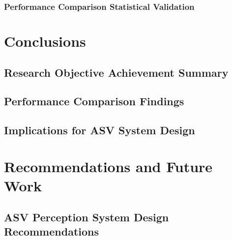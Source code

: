 \documentclass{erauthesis}
\begin{document}
\subsection{Performance Comparison Statistical Validation}

\chapter{Conclusions}


\section{Research Objective Achievement Summary}

\section{Performance Comparison Findings}

\section{Implications for ASV System Design}

\chapter{Recommendations and Future Work}


\section{ASV Perception System Design Recommendations}
\end{document}
